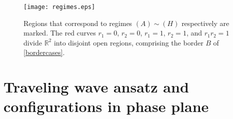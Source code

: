 \documentclass{amsart}
\theoremstyle{definition}
\numberwithin{equation}{section}
\begin{document}


\begin{figure}[ht]
 \centering
 \texttt{[image: regimes.eps]}
 \caption{Regions that correspond to regimes $(A)\sim(H)$ respectively are marked. The red curves $r_1=0$, $r_2=0$, $r_1=1$, $r_2=1$, and $r_1r_2=1$ divide $\mathbb{R}^2$ into disjoint open regions, comprising the border $B$ of \eqref{bordercases}.}
\end{figure}


\section{Traveling wave ansatz and configurations in phase plane} \label{trv}
\end{document}
